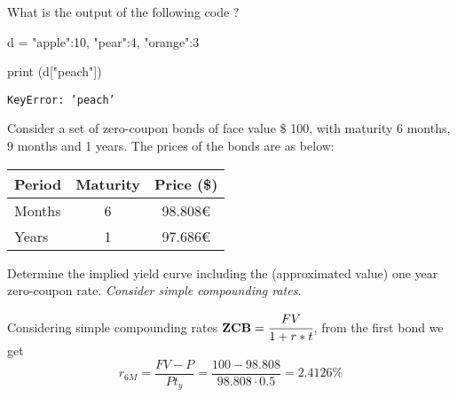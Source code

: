 \documentclass[12pt,a4paper]{exam}
\begin{document}
\begin{questions}




\question
What is the output of the following code ?

\begin{ipython}
d = {"apple":10, "pear":4, "orange":3}

print (d["peach"])
\end{ipython}
\makeemptybox{1cm}
\begin{solution}
\texttt{KeyError: 'peach'}
\end{solution}

\question
Consider a set of zero-coupon bonds of face value \$ 100, with maturity 6 months, 9 months and 1 years. 
The prices of the bonds are as below:
\begin{table}[h]
  \begin{center}
    \begin{tabular}{|l|c|c|}
      \hline
      \textbf{Period} & \textbf{Maturity} & \textbf{Price (\$)} \\ \hline
      Months          & 6                 & 98.808€             \\ \hline
      Years           & 1                 & 97.686€             \\ \hline
    \end{tabular}
  \end{center}
\end{table}
Determine the implied yield curve including the (approximated value) one year zero-coupon rate.
\emph{Consider simple compounding rates.}
\makeemptybox{4cm}
\begin{solution}
Considering simple compounding rates $\textbf{ZCB}=\cfrac{FV}{1+r*t}$, from the first bond we get
\begin{equation*}
  r_{6M} = \frac{FV-P}{Pt_y} = \frac{100 - 98.808}{98.808\cdot0.5} = 2.4126\% 
\end{equation*}


\end{solution}
\end{questions}
\end{document}
